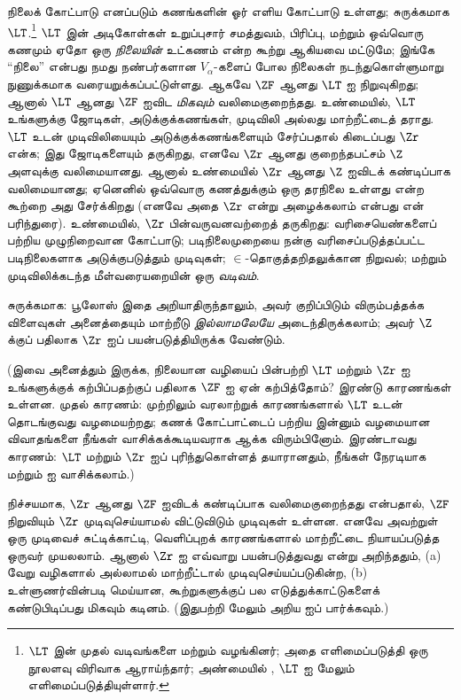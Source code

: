 \documentclass[../../../include/open-logic-section]{subfiles}
\begin{document}
நிலைக் கோட்பாடு எனப்படும் கணங்களின் ஓர் எளிய கோட்பாடு உள்ளது; சுருக்கமாக
$\LT$.\footnote{$\LT$ இன் முதல் வடிவங்களை \citet{Montague1965} மற்றும்
\citet{Scott1974} வழங்கினர்; அதை \citet{Potter2004} எளிமைப்படுத்தி ஒரு
நூலளவு விரிவாக ஆராய்ந்தார்; அண்மையில் \citet{ButtonLT1}, $\LT$ ஐ மேலும்
எளிமைப்படுத்தியுள்ளார்.} $\LT$ இன் அடிகோள்கள் உறுப்புசார் சமத்துவம்,
பிரிப்பு, மற்றும் ஒவ்வொரு கணமும் ஏதோ ஒரு \emph{நிலையின்} உட்கணம் என்ற
கூற்று ஆகியவை மட்டுமே; இங்கே ``நிலை'' என்பது நமது நண்பர்களான
$V_\alpha$-களைப் போல நிலைகள் நடந்துகொள்ளுமாறு நுணுக்கமாக
வரையறுக்கப்பட்டுள்ளது. ஆகவே $\ZF$ ஆனது $\LT$ ஐ நிறுவுகிறது; ஆனால்
$\LT$ ஆனது $\ZF$ ஐவிட \emph{மிகவும்} வலிமைகுறைந்தது. உண்மையில்,
$\LT$ உங்களுக்கு ஜோடிகள், அடுக்குக்கணங்கள், முடிவிலி அல்லது மாற்றீட்டைத்
தராது. $\LT$ உடன் முடிவிலியையும் அடுக்குக்கணங்களையும் சேர்ப்பதால் கிடைப்பது
$\Zr$ என்க; இது ஜோடிகளையும் தருகிறது, எனவே $\Zr$ ஆனது குறைந்தபட்சம்
$\Z$ அளவுக்கு வலிமையானது. ஆனால் உண்மையில் $\Zr$ ஆனது $\Z$ ஐவிடக்
கண்டிப்பாக வலிமையானது; ஏனெனில் ஒவ்வொரு கணத்துக்கும் ஒரு தரநிலை உள்ளது
என்ற கூற்றை அது சேர்க்கிறது (எனவே அதை $\Zr$ என்று அழைக்கலாம் என்பது என்
பரிந்துரை). உண்மையில், $\Zr$ பின்வருவனவற்றைத் தருகிறது: வரிசையெண்களைப்
பற்றிய முழுநிறைவான கோட்பாடு; படிநிலைமுறையை நன்கு வரிசைப்படுத்தப்பட்ட
படிநிலைகளாக அடுக்குபடுத்தும் முடிவுகள்; $\in$-தொகுத்தறிதலுக்கான நிறுவல்;
மற்றும் முடிவிலிக்கடந்த மீள்வரையறையின் ஒரு \emph{வடிவம்}.

சுருக்கமாக: பூலோஸ் இதை அறியாதிருந்தாலும், அவர் குறிப்பிடும் விரும்பத்தக்க
விளைவுகள் அனைத்தையும் மாற்றீடு \emph{இல்லாமலேயே} அடைந்திருக்கலாம்; அவர்
$\Z$ க்குப் பதிலாக $\Zr$ ஐப் பயன்படுத்தியிருக்க வேண்டும்.

(இவை அனைத்தும் இருக்க, நிலையான வழியைப் பின்பற்றி $\LT$ மற்றும் $\Zr$ ஐ
உங்களுக்குக் கற்பிப்பதற்குப் பதிலாக $\ZF$ ஐ ஏன் கற்பித்தோம்? இரண்டு
காரணங்கள் உள்ளன. முதல் காரணம்: முற்றிலும் வரலாற்றுக் காரணங்களால் $\LT$
உடன் தொடங்குவது வழமையற்றது; கணக் கோட்பாட்டைப் பற்றிய இன்னும் வழமையான
விவாதங்களை நீங்கள் வாசிக்கக்கூடியவராக ஆக்க விரும்பினோம். இரண்டாவது காரணம்:
$\LT$ மற்றும் $\Zr$ ஐப் புரிந்துகொள்ளத் தயாரானதும், நீங்கள் நேரடியாக
\citealt{Potter2004} மற்றும் \citealt{ButtonLT1} ஐ வாசிக்கலாம்.)

நிச்சயமாக, $\Zr$ ஆனது $\ZF$ ஐவிடக் கண்டிப்பாக வலிமைகுறைந்தது என்பதால்,
$\ZF$ நிறுவியும் $\Zr$ முடிவுசெய்யாமல் விட்டுவிடும் முடிவுகள் உள்ளன. எனவே
அவற்றுள் ஒரு முடிவைச் சுட்டிக்காட்டி, வெளிப்புறக் காரணங்களால் மாற்றீட்டை
நியாயப்படுத்த ஒருவர் முயலலாம். ஆனால் $\Zr$ ஐ எவ்வாறு பயன்படுத்துவது என்று
அறிந்ததும், (a) வேறு வழிகளால் அல்லாமல் மாற்றீட்டால் முடிவுசெய்யப்படுகின்ற,
(b) உள்ளுணர்வின்படி மெய்யான, கூற்றுகளுக்குப் பல எடுத்துக்காட்டுகளைக்
கண்டுபிடிப்பது மிகவும் கடினம். (இதுபற்றி மேலும் அறிய
\citealt[\S13.2]{Potter2004} ஐப் பார்க்கவும்.)
\end{document}
